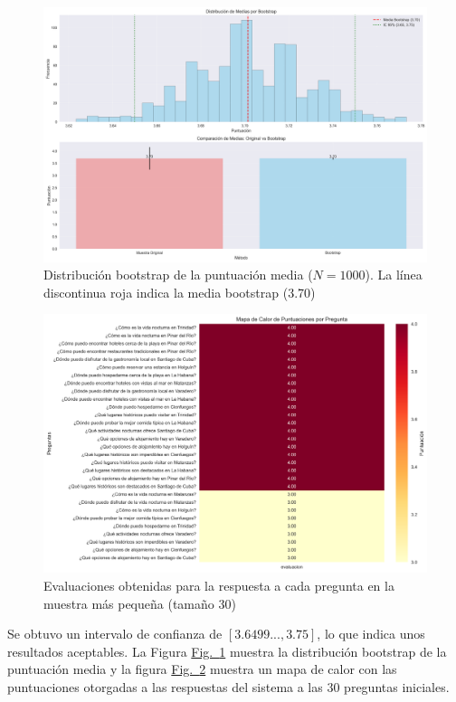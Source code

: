 \documentclass[10pt]{llncs}
\newcommand{\figref}[1]{\hyperref[#1]{Fig.~\ref*{#1}}}
\begin{document}
\begin{figure}[h]
\centering
\includegraphics[width=1\textwidth]{../src/experiments/one_only_agent/bootstrap_distribution_20250614-143724.png}
\caption{Distribución bootstrap de la puntuación media ($N=1000$). La línea discontinua roja indica la media bootstrap (3.70)}
\label{fig:boot_dist_1}
\end{figure}

\begin{figure}[h]
\centering
\includegraphics[width=1\textwidth]{../src/experiments/one_only_agent/quality_heatmap_20250614-143724.png}
\caption{Evaluaciones obtenidas para la respuesta a cada pregunta en la muestra más pequeña (tamaño 30)}
\label{fig:eval_1}
\end{figure}

\begin{remark}
Se obtuvo un intervalo de confianza de $[3.6499..., 3.75]$, lo que indica unos resultados aceptables. 
La Figura {\figref{fig:boot_dist_1}} muestra la distribución bootstrap de la puntuación media y la figura
{\figref{fig:eval_1}} muestra un mapa de calor con las puntuaciones otorgadas a las respuestas del sistema a las 
30 preguntas iniciales.
\end{remark}
\end{document}
